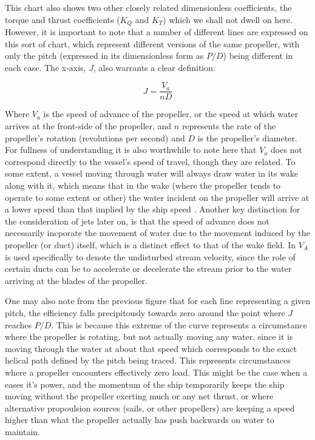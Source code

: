 \documentclass{article}\usepackage[]{graphicx}\usepackage[]{color}
\begin{document}
This chart also shows two other closely related dimensionless coefficients, the torque and thrust coefficients ($K_Q$ and $K_T$) which we shall not dwell on here.  However, it is important to note that a number of different lines are expressed on this sort of chart, which represent different versions of the same propeller, with only the pitch (expressed in its dimensionless form as $P/D$) being different in each case. The x-axis, $J$, also warrants a clear definition:

\begin{equation}
\label{eq:2}
J = \frac{V_a}{nD}
\end{equation}

Where $V_a$ is the speed of advance of the propeller, or the speed at which water arrives at the front-side of the propeller, and $n$ represents the rate of the propeller's rotation (revolutions per second) and $D$ is the propeller's diameter.  For fullness of understanding it is also worthwhile to note here that $V_a$ does not correspond directly to the vessel's speed of travel, though they are related. To some extent, a vessel moving through water will always draw water in its wake along with it, which means that in the wake (where the propeller tends to operate to some extent or other) the water incident on the propeller will arrive at a lower speed than that implied by the ship speed \parencite[15]{MAN2017}.  Another key distinction for the consideration of jets later on, is that the speed of advance does not necessarily incporate the movement of water due to the movement induced by the propeller (or duct) itself, which is a distinct effect to that of the wake field. In \cite[213]{lewis1988} $V_A$ is used specifically to denote the undisturbed stream velocity, since the role of certain ducts can be to accelerate or decelerate the stream prior to the water arriving at the blades of the propeller.

One may also note from the previous figure that for each line representing a given pitch, the efficiency falls precipitously towards zero around the point where $J$ reaches $P/D$. This is because this extreme of the curve represents a circumstance where the propeller is rotating, but not actually moving any water, since it is moving through the water at about that speed which corresponds to the exact helical path defined by the pitch being traced. This represents circumstances where a propeller encounters effectively zero load.  This might be the case when a eases it's power, and the momentum of the ship temporarily keeps the ship moving without the propeller exerting much or any net thrust, or where alternative propoulsion sources (sails, or other propellers) are keeping a speed higher than what the propeller actually has push backwards on water to maintain.
\end{document}
